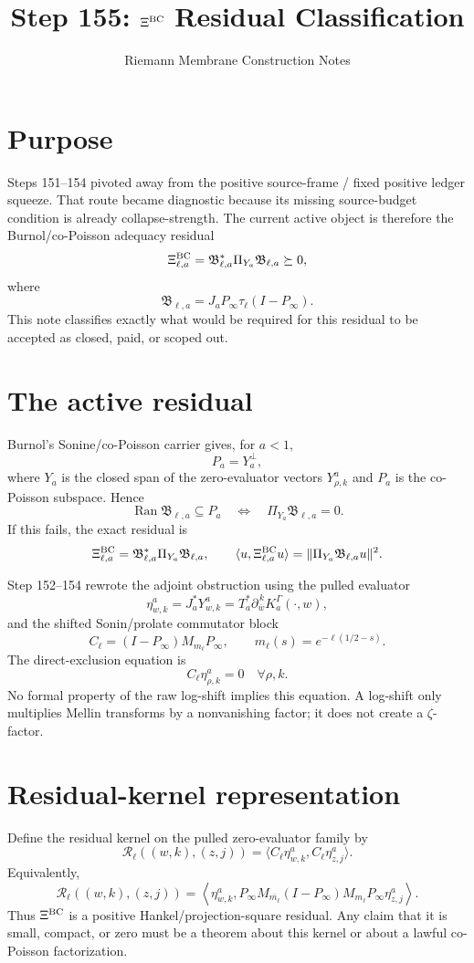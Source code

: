 \documentclass[11pt]{article}
\title{Step 155: \texorpdfstring{$\Xi^{\rm BC}$}{XiBC} Residual Classification}
\author{Riemann Membrane Construction Notes}
\date{}
\newcommand{\Ran}{\operatorname{Ran}}
\newcommand{\XiBC}{\Xi^{\rm BC}}
\newcommand{\Pa}{P_a}
\newcommand{\Ya}{Y_a}
\newcommand{\Bell}{\mathfrak B_{\ell,a}}
\newcommand{\Cell}{C_\ell}
\begin{document}
\maketitle

\section*{Purpose}
Steps 151--154 pivoted away from the positive source-frame / fixed positive ledger squeeze.  That route became diagnostic because its missing source-budget condition is already collapse-strength.  The current active object is therefore the Burnol/co-Poisson adequacy residual
\[
  \XiBC_{\ell,a}=\Bell^*\Pi_{\Ya}\Bell\succeq0,
\]
where
\[
  \Bell=J_aP_\infty\tau_\ell(I-P_\infty).
\]
This note classifies exactly what would be required for this residual to be accepted as closed, paid, or scoped out.

\section{The active residual}
Burnol's Sonine/co-Poisson carrier gives, for $a<1$,
\[
  \Pa=\Ya^\perp,
\]
where $\Ya$ is the closed span of the zero-evaluator vectors $Y^a_{\rho,k}$ and $\Pa$ is the co-Poisson subspace.  Hence
\[
  \Ran\Bell\subseteq \Pa
  \quad\Longleftrightarrow\quad
  \Pi_{\Ya}\Bell=0.
\]
If this fails, the exact residual is
\[
  \XiBC_{\ell,a}=\Bell^*\Pi_{\Ya}\Bell,
  \qquad
  \langle u,\XiBC_{\ell,a}u\rangle=\|\Pi_{\Ya}\Bell u\|^2.
\]

Step 152--154 rewrote the adjoint obstruction using the pulled evaluator
\[
  \eta^a_{w,k}=J_a^*Y^a_{w,k}
  =T_a^*\partial_{\bar w}^{\,k}K_a^\Gamma(\cdot,w),
\]
and the shifted Sonin/prolate commutator block
\[
  \Cell=(I-P_\infty)M_{m_\ell}P_\infty,
  \qquad
  m_\ell(s)=e^{-\ell(1/2-s)}.
\]
The direct-exclusion equation is
\[
  \boxed{\Cell\eta^a_{\rho,k}=0\quad\forall \rho,k.}
\]
No formal property of the raw log-shift implies this equation.  A log-shift only multiplies Mellin transforms by a nonvanishing factor; it does not create a $\zeta$-factor.

\section{Residual-kernel representation}
Define the residual kernel on the pulled zero-evaluator family by
\[
  \mathcal R_\ell((w,k),(z,j))
  =\langle \Cell\eta^a_{w,k},\Cell\eta^a_{z,j}\rangle.
\]
Equivalently,
\[
  \mathcal R_\ell((w,k),(z,j))
  =\left\langle
    \eta^a_{w,k},
    P_\infty M_{\overline{m_\ell}}(I-P_\infty)M_{m_\ell}P_\infty
    \eta^a_{z,j}
  \right\rangle.
\]
Thus $\XiBC$ is a positive Hankel/projection-square residual.  Any claim that it is small, compact, or zero must be a theorem about this kernel or about a lawful co-Poisson factorization.
\end{document}
